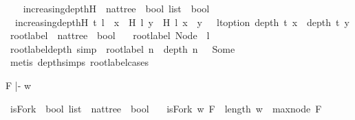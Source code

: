 \begin{isabellebody}
\isanewline
%
\endisadelimproof
\ \ \isanewline
{}\isamarkupfalse%
\ increasing{\isacharunderscore}depth{\isacharunderscore}H\ {\isacharcolon}{\isacharcolon}\ {\isachardoublequoteopen}nattree\ {\isasymRightarrow}\ bool\ list\ {\isasymRightarrow}\ bool{\isachardoublequoteclose}\ \ \isanewline
\ \ {\isachardoublequoteopen}increasing{\isacharunderscore}depth{\isacharunderscore}H\ t\ l\ {\isacharequal}\ {\isacharparenleft}{\isasymforall}x\ {\isasymin}\ H\ l{\isachardot}\ {\isasymforall}y\ {\isasymin}\ H\ l{\isachardot}\ x\ {\isacharless}\ y\ {\isasymlongrightarrow}\ \ lt{\isacharunderscore}option\ {\isacharparenleft}depth\ t\ x{\isacharparenright}\ \ {\isacharparenleft}depth\ t\ y{\isacharparenright}{\isacharparenright}{\isachardoublequoteclose}\isanewline
\isanewline
{}\isamarkupfalse%
\ root{\isacharunderscore}label{\isacharunderscore}{}\ {\isacharcolon}{\isacharcolon}\ {\isachardoublequoteopen}nattree\ {\isasymRightarrow}\ bool{\isachardoublequoteclose}\ \isanewline
\ \ {\isachardoublequoteopen}root{\isacharunderscore}label{\isacharunderscore}{}\ {\isacharparenleft}Node\ {}\ l{\isacharparenright}{\isachardoublequoteclose}\isanewline
\ \ \isanewline
{}\isamarkupfalse%
\ root{\isacharunderscore}label{\isacharunderscore}{}{\isacharunderscore}depth{\isacharunderscore}{}\ {\isacharbrackleft}simp{\isacharbrackright}\ {\isacharcolon}\ {\isachardoublequoteopen}root{\isacharunderscore}label{\isacharunderscore}{}\ n\ {\isasymlongrightarrow}\ depth\ n\ {}\ {\isacharequal}\ Some\ {}{\isachardoublequoteclose}\isanewline
%
\isadelimproof
\ \ %
\endisadelimproof
%
\isatagproof
{}\isamarkupfalse%
\ {\isacharparenleft}metis\ depth{\isachardot}simps{\isacharparenleft}{}{\isacharparenright}\ root{\isacharunderscore}label{\isacharunderscore}{}{\isachardot}cases{\isacharparenright}%
\endisatagproof
{\isafoldproof}%
%
\isadelimproof
%
\endisadelimproof
%
\begin{isamarkuptext}%
F |- w%
\end{isamarkuptext}\isamarkuptrue%
\isamarkupfalse%
\ isFork\ {\isacharcolon}{\isacharcolon}\ {\isachardoublequoteopen}bool\ list\ {\isasymRightarrow}\ nattree\ {\isasymRightarrow}\ bool{\isachardoublequoteclose}\ \isanewline
\ \ {\isachardoublequoteopen}isFork\ w\ F\ {\isacharequal}\ {\isacharparenleft}{\isacharparenleft}length\ w\ {\isasymge}\ max{\isacharunderscore}node\ F{\isacharparenright}\ \isanewline

\end{isabellebody}

